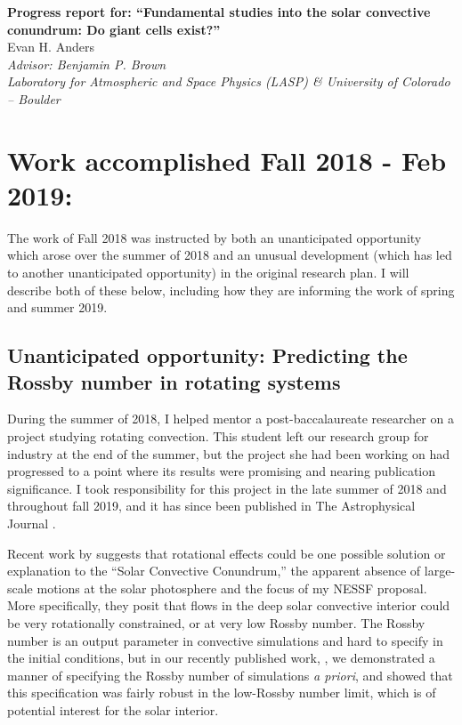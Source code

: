 \documentclass[aasms,12pt]{article}
\begin{document}
\begin{center}
   \large\textbf{Progress report for: ``Fundamental studies into the solar convective conundrum: Do giant cells exist?''}\\
   \vspace{0.2cm}
   \large{Evan H. Anders}\\
   \vspace{0.2cm}
   \normalsize\textit{Advisor: Benjamin P. Brown}\\
   \normalsize\textit{Laboratory for Atmospheric and Space Physics (LASP) \& University of Colorado -- Boulder}\\
\end{center}

\vspace{-0.6cm}
\section{Work accomplished Fall 2018 - Feb 2019:}
The work of Fall 2018 was instructed by both an unanticipated opportunity which arose over the
summer of 2018 and an unusual development (which has led to another unanticipated opportunity)
in the original research plan. I will describe both 
of these below, including how they are informing the work of spring and summer 2019.

\subsection{Unanticipated opportunity: Predicting the Rossby number in rotating systems}
During the summer of 2018, I helped mentor a post-baccalaureate researcher on a project
studying rotating convection. This student left our research group for industry at the end of
the summer, but the project she had been working on had progressed to a point where
its results were promising and nearing publication significance. I took responsibility for
this project in the late summer of 2018 and throughout fall 2019, and it has since been published
in The Astrophysical Journal \citep{anders&all2019}.

Recent work by \cite{featherstone&hindman2016} suggests that rotational effects could be
one possible solution or explanation
to the ``Solar Convective Conundrum,'' the apparent absence of large-scale motions at the
solar photosphere and the focus of my NESSF proposal. More specifically, they posit that flows
in the deep solar convective interior could be very rotationally constrained, or at very low
Rossby number. The Rossby number is an output parameter in convective simulations and hard
to specify in the initial conditions, but in our recently published work, \citet{anders&all2019}, 
we demonstrated a manner of specifying the Rossby number of simulations \emph{a priori},
and showed that this specification was fairly robust in the low-Rossby number limit, which
is of potential interest for the solar interior.
\end{document}
